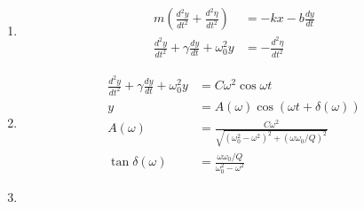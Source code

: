 \documentclass{article}
\begin{document}
\setcounter{subsection}{5}
\subsection{}

\begin{enumerate}
  \item

        \begin{align*}
          m \left( \frac{d^2 y}{d t^2} + \frac{d^2 \eta}{d t^2} \right) & = -k x - b \frac{d y}{d t} \\
          \frac{d^2 y}{d t^2} + \gamma \frac{d y}{d t} + \omega_0^2 y   & = -\frac{d^2 \eta}{d t^2}
        \end{align*}

  \item

        \begin{align*}
          \frac{d^2 y}{d t^2} + \gamma \frac{d y}{d t} + \omega_0^2 y & = C \omega^2 \cos \omega t                                                      \\
          y                                                           & = A(\omega) \cos (\omega t + \delta(\omega))                                    \\
          A(\omega)                                                   & = \frac{C \omega^2}{\sqrt{(\omega_0^2 - \omega^2)^2 + (\omega \omega_0 / Q)^2}} \\
          \tan \delta(\omega)                                         & = \frac{\omega \omega_0 / Q}{\omega_0^2 - \omega^2}
        \end{align*}

        \setcounter{enumi}{3}
  \item


\end{enumerate}
\end{document}

